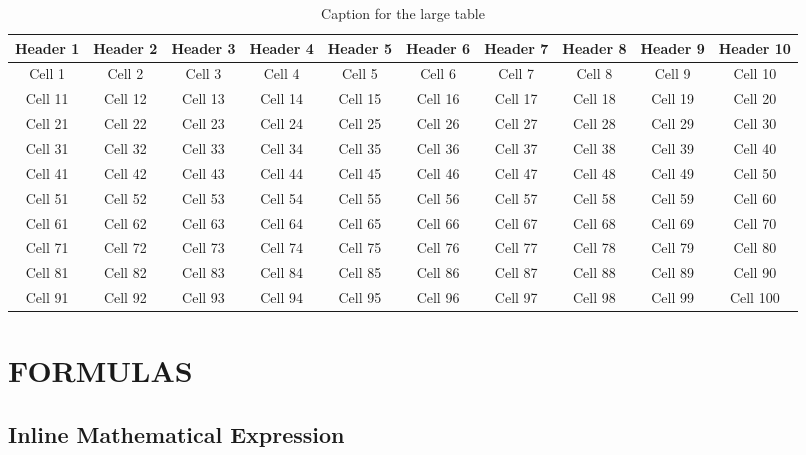 \documentclass[a4paper,12pt]{article}
\begin{document}
\begin{table}
    \centering
    \caption{Caption for the large table}
    \begin{tabular}{cccccccccc}
        \toprule
        Header 1 & Header 2 & Header 3 & Header 4 & Header 5 & Header 6 & Header 7 & Header 8 & Header 9 & Header 10 \\
        \midrule
        Cell 1 & Cell 2 & Cell 3 & Cell 4 & Cell 5 & Cell 6 & Cell 7 & Cell 8 & Cell 9 & Cell 10 \\ [5ex]
        Cell 11 & Cell 12 & Cell 13 & Cell 14 & Cell 15 & Cell 16 & Cell 17 & Cell 18 & Cell 19 & Cell 20 \\ [5ex]
        Cell 21 & Cell 22 & Cell 23 & Cell 24 & Cell 25 & Cell 26 & Cell 27 & Cell 28 & Cell 29 & Cell 30 \\ [5ex]
        Cell 31 & Cell 32 & Cell 33 & Cell 34 & Cell 35 & Cell 36 & Cell 37 & Cell 38 & Cell 39 & Cell 40 \\ [5ex]
        Cell 41 & Cell 42 & Cell 43 & Cell 44 & Cell 45 & Cell 46 & Cell 47 & Cell 48 & Cell 49 & Cell 50 \\ [5ex]
        Cell 51 & Cell 52 & Cell 53 & Cell 54 & Cell 55 & Cell 56 & Cell 57 & Cell 58 & Cell 59 & Cell 60 \\ [5ex]
        Cell 61 & Cell 62 & Cell 63 & Cell 64 & Cell 65 & Cell 66 & Cell 67 & Cell 68 & Cell 69 & Cell 70 \\ [5ex]
        Cell 71 & Cell 72 & Cell 73 & Cell 74 & Cell 75 & Cell 76 & Cell 77 & Cell 78 & Cell 79 & Cell 80 \\ [5ex]
        Cell 81 & Cell 82 & Cell 83 & Cell 84 & Cell 85 & Cell 86 & Cell 87 & Cell 88 & Cell 89 & Cell 90 \\ [5ex]
        Cell 91 & Cell 92 & Cell 93 & Cell 94 & Cell 95 & Cell 96 & Cell 97 & Cell 98 & Cell 99 & Cell 100 \\

        \bottomrule
    \end{tabular}
    \label{tab:myLargeTable}
\end{table}


\section{FORMULAS}

\subsection{Inline Mathematical Expression}
\end{document}
